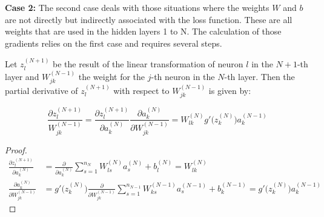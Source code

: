 \textbf{Case 2:} The second case deals with those situations where the weights $W$ and $b$ are not directly but indirectly associated with the loss function. These are all weights that are used in the hidden layers 1 to N. The calculation of those gradients relies on the first case and requires several steps.

\begin{remark}\label{rem:chain_rule}
	Let $z_l^{(N+1)}$ be the result of the linear transformation of neuron $l$ in the $N+1$-th layer and $W_{jk}^{(N-1)}$ the weight for the $j$-th neuron in the $N$-th layer. Then the partial derivative of $z_l^{(N+1)}$ with respect to $W_{jk}^{(N-1)}$ is given by:
	
	\begin{equation}
		\frac{\partial z_l^{(N+1)}}{W_{jk}^{(N-1)}} = \frac{\partial z_l^{(N+1)}}{\partial a_k^{(N)}}\frac{\partial a_k^{(N)}}{\partial W_{jk}^{(N-1)}} = W_{lk}^{(N)} g' \big( z_k^{(N)}\big) a_k^{(N-1)}
	\end{equation}
	
	\begin{proof}
		\begin{align*}
			\frac{\partial z_l^{(N+1)}}{\partial a_k^{(N)}} &= \frac{\partial}{\partial a_k^{(N)}} \sum_{s=1}^{n_N} W_{ls}^{(N)}a_s^{(N)} + b_l^{(N)} = W_{lk}^{(N)} \\
			\frac{\partial a_k^{(N)}}{\partial W_{jk}^{(N-1)}} &= g' \big( z_k^{(N)}\big) \frac{\partial}{\partial W_{jk}^{(N-1)}} \sum_{s=1}^{n_{N-1}} W_{ks}^{(N-1)}a_s^{(N-1)} + b_k^{(N-1)} = g' \big( z_k^{(N)}\big) a_k^{(N-1)}
		\end{align*}
	\end{proof}
\end{remark}

